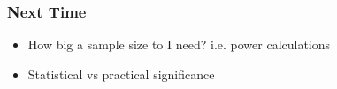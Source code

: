 \documentclass[handout]{beamer}
\newcommand{\blue}[1]{\textcolor{blue2}{#1}}
\newcommand{\xbar}{\overline{x}}
\begin{document}
%


\begin{frame}[fragile]
\frametitle{Next Time}

\begin{itemize}
\item How big a sample size to I need? i.e. power calculations
\item Statistical vs practical significance
\end{itemize}

\end{frame}
\end{document}
